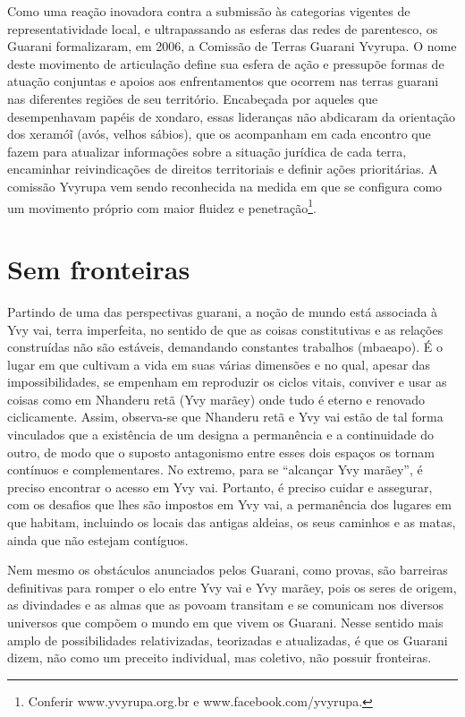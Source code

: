 Como uma reação inovadora contra a submissão às categorias vigentes de
representatividade local, e ultrapassando as esferas das redes de
parentesco, os Guarani formalizaram, em 2006, a Comissão de Terras
Guarani Yvyrupa.  O nome deste movimento de articulação define sua
esfera de ação e pressupõe formas de atuação conjuntas e apoios aos
enfrentamentos que ocorrem nas terras guarani nas diferentes regiões de
seu território. Encabeçada por aqueles que desempenhavam papéis de
xondaro, essas lideranças não abdicaram da orientação dos
xeramóĩ (avós, velhos sábios), que os acompanham
em cada encontro que fazem para atualizar informações sobre a situação
jurídica de cada terra, encaminhar reivindicações de direitos
territoriais e definir ações prioritárias. A comissão Yvyrupa vem sendo
reconhecida na medida em que se configura como um movimento próprio com
maior fluidez e penetração\footnote{Conferir www.yvyrupa.org.br e
www.facebook.com/yvyrupa.}. 

\section{Sem fronteiras}

Partindo de uma das perspectivas guarani, a noção de mundo está
associada à Yvy vai, terra imperfeita, no sentido de que as coisas
constitutivas e as relações construídas não são estáveis, demandando
constantes trabalhos (mbaeapo). É o lugar em que cultivam a vida em
suas várias dimensões e no qual, apesar das impossibilidades, se
empenham em reproduzir os ciclos vitais, conviver e usar as coisas como
em Nhanderu retã (Yvy marãey) onde tudo é eterno e renovado
ciclicamente. Assim, observa-se que Nhanderu retã e Yvy vai estão de
tal forma vinculados que a existência de um designa a permanência e a
continuidade do outro, de modo que o suposto antagonismo entre esses
dois espaços os tornam contínuos e complementares. No extremo, para se
``alcançar Yvy marãey'', é preciso encontrar o acesso em Yvy vai.
Portanto, é preciso cuidar e assegurar, com os desafios que lhes são
impostos em Yvy vai, a permanência dos lugares em que habitam,
incluindo os locais das antigas aldeias, os seus caminhos e as matas,
ainda que não estejam contíguos. 

Nem mesmo os obstáculos anunciados pelos Guarani, como provas, são
barreiras definitivas para romper o elo entre Yvy vai e Yvy marãey,
pois os seres de origem, as divindades e as almas que as povoam
transitam e se comunicam nos diversos universos que compõem o mundo em
que vivem os Guarani. Nesse sentido mais amplo de possibilidades
relativizadas, teorizadas e atualizadas, é que os Guarani dizem, não
como um preceito individual, mas coletivo, não possuir fronteiras.

